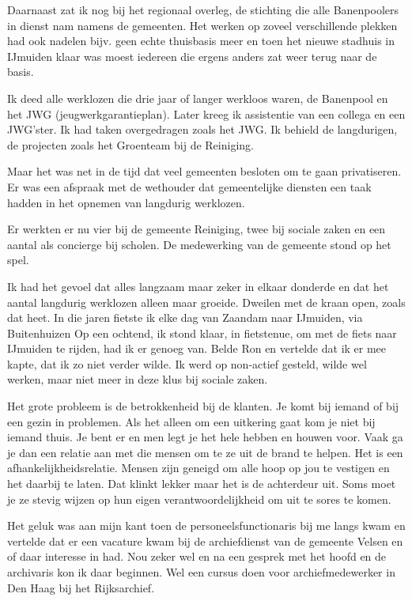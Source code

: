 \documentclass[10pt,twoside,openright]{memoir}
\begin{document}
Daarnaast zat ik nog bij het regionaal overleg, de stichting die alle Banenpoolers in dienst nam namens de gemeenten. Het werken op zoveel verschillende plekken had ook nadelen bijv. geen echte thuisbasis meer en toen het nieuwe stadhuis in IJmuiden klaar was moest iedereen die ergens anders zat weer terug naar de basis. 

Ik deed alle werklozen die drie jaar of langer werkloos waren, de Banenpool en het JWG (jeugwerkgarantieplan). Later kreeg ik assistentie van een collega en een JWG’ster. Ik had taken overgedragen zoals het JWG. Ik behield de langdurigen, de projecten zoals het Groenteam bij de Reiniging. 

Maar het was net in de tijd dat veel gemeenten besloten om te gaan privatiseren. Er was een afspraak met de wethouder dat gemeentelijke diensten een taak hadden in het opnemen van langdurig werklozen. 

Er werkten er nu vier bij de gemeente Reiniging, twee bij sociale zaken en een aantal als concierge bij scholen. De medewerking van de gemeente stond op het spel. 

Ik had het gevoel dat alles langzaam maar zeker in elkaar donderde en dat het aantal langdurig werklozen alleen maar groeide. Dweilen met de kraan open, zoals dat heet. In die jaren fietste ik elke dag van Zaandam naar IJmuiden, via Buitenhuizen Op een ochtend, ik stond klaar, in fietstenue, om met de fiets naar IJmuiden te rijden, had ik er genoeg van. Belde Ron en vertelde dat ik er mee kapte, dat ik zo niet verder wilde. Ik werd op non-actief gesteld, wilde wel werken, maar niet meer in deze klus bij sociale zaken.

Het grote probleem is de betrokkenheid bij de klanten. Je komt bij iemand of bij een gezin in problemen. Als het alleen om een uitkering gaat kom je niet bij iemand thuis. Je bent er en men legt je het hele hebben en houwen voor. Vaak ga je dan een relatie aan met die mensen om te ze uit de brand te helpen. Het is een afhankelijkheidsrelatie. Mensen zijn geneigd om alle hoop op jou te vestigen en het daarbij te laten. Dat klinkt lekker maar het is de achterdeur uit. Soms moet je ze stevig wijzen op hun eigen verantwoordelijkheid om uit te sores te komen. 

Het geluk was aan mijn kant toen de personeelsfunctionaris bij me langs kwam en vertelde dat er een vacature kwam bij de archiefdienst van de gemeente Velsen en of daar interesse in had. Nou zeker wel en na een gesprek met het hoofd en de archivaris kon ik daar beginnen. Wel een cursus doen voor archiefmedewerker in Den Haag bij het Rijksarchief. 
\end{document}
